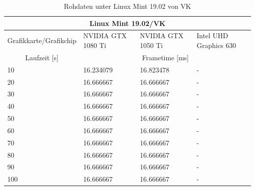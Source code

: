 \documentclass[titlepage, 11pt, a4paper, ngerman]{article}
\begin{document}
\begin{table}[ht]
    \centering
    \caption[Rohdaten unter \gls{Linux} Mint 19.02 von VK]{Rohdaten unter \gls{Linux} Mint 19.02 von VK}
    \bigbreak
    \begin{tabular}{|p{4cm}||p{2.5cm}|p{2.5cm}|p{3cm}|}
    \hline
    \multicolumn{4}{|c|}{\gls{Linux} Mint 19.02/VK} \\
    \hline
    Grafikkarte/Grafikchip & NVIDIA GTX 1080 Ti & NVIDIA GTX 1050 Ti & Intel UHD Graphics 630 \\
    \hline
    \hline
    \multicolumn{1}{|c||}{Laufzeit [s]} & \multicolumn{3}{|c|}{\gls{Frametime} [ms]} \\
    \hline
    10 & 16.234079 & 16.823478 & - \\
    \hline
    20 & 16.666667 & 16.666667 & - \\
    \hline
    30 & 16.666667 & 16.666667 & - \\
    \hline
    40 & 16.666667 & 16.666667 & - \\
    \hline
    50 & 16.666667 & 16.666667 & - \\
    \hline
    60 & 16.666667 & 16.666667 & - \\
    \hline
    70 & 16.666667 & 16.666667 & - \\
    \hline
    80 & 16.666667 & 16.666667 & - \\
    \hline
    90 & 16.666667 & 16.666667 & - \\
    \hline
    100 & 16.666667 & 16.666667 & - \\
    \hline
    \end{tabular}
    \label{Tab:results-raw-mint-vk}
\end{table}
\end{document}

